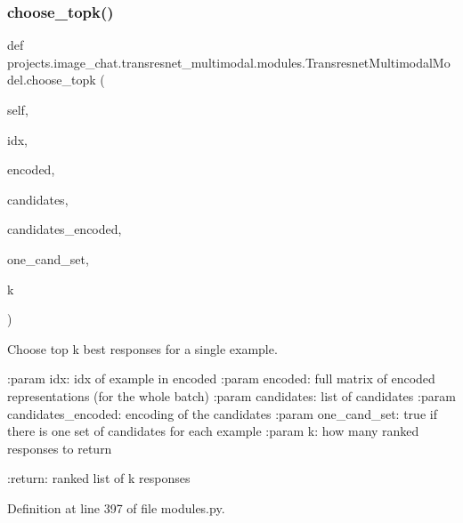 \mbox{\label{classprojects_1_1image__chat_1_1transresnet__multimodal_1_1modules_1_1TransresnetMultimodalModel_a16771c029f996c0aa05a773000e40a11}} 
\subsubsection{\texorpdfstring{choose\+\_\+topk()}{choose\_topk()}}
{\footnotesize\ttfamily def projects.\+image\+\_\+chat.\+transresnet\+\_\+multimodal.\+modules.\+Transresnet\+Multimodal\+Model.\+choose\+\_\+topk (\begin{DoxyParamCaption}\item[{}]{self,  }\item[{}]{idx,  }\item[{}]{encoded,  }\item[{}]{candidates,  }\item[{}]{candidates\+\_\+encoded,  }\item[{}]{one\+\_\+cand\+\_\+set,  }\item[{}]{k }\end{DoxyParamCaption})}

\begin{DoxyVerb}Choose top k best responses for a single example.

:param idx:
    idx of example in encoded
:param encoded:
    full matrix of encoded representations (for the whole batch)
:param candidates:
    list of candidates
:param candidates_encoded:
    encoding of the candidates
:param one_cand_set:
    true if there is one set of candidates for each example
:param k:
    how many ranked responses to return

:return:
    ranked list of k responses
\end{DoxyVerb}
 

Definition at line 397 of file modules.\+py.


